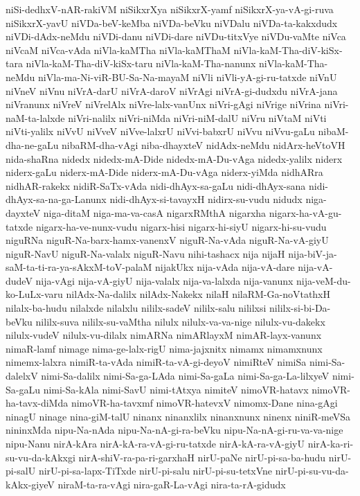 {niSi-dedhxV-nAR-rakiVM
niSikxrXya
niSikxrX-yamf
niSikxrX-ya-vA-gi-ruva
niSikxrX-yavU
niVDa-beV-keMba
niVDa-beVku
niVDalu
niVDa-ta-kakxdudx
niVDi-dAdx-neMdu
niVDi-danu
niVDi-dare
niVDu-titxVye
niVDu-vaMte
niVca
niVcaM
niVca-vAda
niVla-kaMTha
niVla-kaMThaM
niVla-kaM-Tha-diV-kiSx-tara
niVla-kaM-Tha-diV-kiSx-taru
niVla-kaM-Tha-nanunx
niVla-kaM-Tha-neMdu
niVla-ma-Ni-viR-BU-Sa-Na-mayaM
niVli
niVli-yA-gi-ru-tatxde
niVnU
niVneV
niVnu
niVrA-darU
niVrA-daroV
niVrAgi
niVrA-gi-dudxdu
niVrA-jana
niVranunx
niVreV
niVrelAlx
niVre-lalx-vanUnx
niVri-gAgi
niVrige
niVrina
niVri-naM-ta-lalxde
niVri-nalilx
niVri-niMda
niVri-niM-dalU
niVru
niVtaM
niVti
niVti-yalilx
niVvU
niVveV
niVve-lalxrU
niVvi-babxrU
niVvu
niVvu-gaLu
nibaM-dha-ne-gaLu
nibaRM-dha-vAgi
niba-dhayxteV
nidAdx-neMdu
nidArx-heVtoVH
nida-shaRna
nidedx
nidedx-mA-Dide
nidedx-mA-Du-vAga
nidedx-yalilx
niderx
niderx-gaLu
niderx-mA-Dide
niderx-mA-Du-vAga
niderx-yiMda
nidhARra
nidhAR-rakekx
nidiR-SaTx-vAda
nidi-dhAyx-sa-gaLu
nidi-dhAyx-sana
nidi-dhAyx-sa-na-ga-Lanunx
nidi-dhAyx-si-tavayxH
nidirx-su-vudu
nidudx
niga-dayxteV
niga-ditaM
niga-ma-va-casA
nigarxRMthA
nigarxha
nigarx-ha-vA-gu-tatxde
nigarx-ha-ve-nunx-vudu
nigarx-hisi
nigarx-hi-siyU
nigarx-hi-su-vudu
niguRNa
niguR-Na-barx-hamx-vanenxV
niguR-Na-vAda
niguR-Na-vA-giyU
niguR-NavU
niguR-Na-valalx
niguR-Navu
nihi-tashacx
nija
nijaH
nija-biV-ja-saM-ta-ti-ra-ya-sAkxM-toV-palaM
nijakUkx
nija-vAda
nija-vA-dare
nija-vA-dudeV
nija-vAgi
nija-vA-giyU
nija-valalx
nija-va-lalxda
nija-vanunx
nija-veM-du-ko-LuLx-varu
nilAdx-Na-dalilx
nilAdx-Nakekx
nilaH
nilaRM-Ga-noVtathxH
nilalx-ba-hudu
nilalxde
nilalxlu
nililx-sadeV
nililx-salu
nililxsi
nililx-si-bi-Da-beVku
nililx-suva
nililx-su-vaMtha
nilulx
nilulx-va-va-nige
nilulx-vu-dakekx
nilulx-vudeV
nilulx-vu-dilalx
nimARNa
nimARlayxM
nimAR-layx-vanunx
nimaR-lamf
nimage
nima-ge-lalx-rigU
nima-jajxnitx
nimamx
nimamxnunx
nimemx-lalxra
nimiR-ta-vAda
nimiR-ta-vA-gi-deyoV
nimiRteV
nimiSa
nimi-Sa-dalelxV
nimi-Sa-dalilx
nimi-Sa-ga-LAda
nimi-Sa-gaLa
nimi-Sa-ga-La-lilxyeV
nimi-Sa-gaLu
nimi-Sa-kAla
nimi-SavU
nimi-tAtxya
nimiteV
nimoVR-hatavx
nimoVR-ha-tavx-diMda
nimoVR-ha-tavxmf
nimoVR-hatevxV
nimomx-Dane
nina-gAgi
ninagU
ninage
nina-giM-talU
ninanx
ninanxlilx
ninanxnunx
ninenx
niniR-meVSa
nininxMda
nipu-Na-nAda
nipu-Na-nA-gi-ra-beVku
nipu-Na-nA-gi-ru-va-va-nige
nipu-Nanu
nirA-kAra
nirA-kA-ra-vA-gi-ru-tatxde
nirA-kA-ra-vA-giyU
nirA-ka-ri-su-vu-da-kAkxgi
nirA-shiV-ra-pa-ri-garxhaH
nirU-paNe
nirU-pi-sa-ba-hudu
nirU-pi-salU
nirU-pi-sa-lapx-TiTxde
nirU-pi-salu
nirU-pi-su-tetxVne
nirU-pi-su-vu-da-kAkx-giyeV
niraM-ta-ra-vAgi
nira-gaR-La-vAgi
nira-ta-rA-gidudx
}
